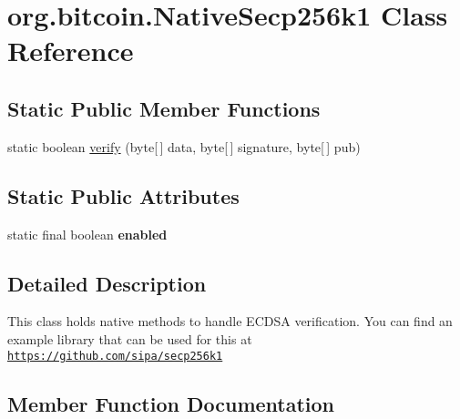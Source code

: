 \hypertarget{classorg_1_1bitcoin_1_1_native_secp256k1}{}\section{org.\+bitcoin.\+Native\+Secp256k1 Class Reference}
\label{classorg_1_1bitcoin_1_1_native_secp256k1}
\subsection*{Static Public Member Functions}
\begin{DoxyCompactItemize}
\item 
static boolean \mbox{\hyperlink{classorg_1_1bitcoin_1_1_native_secp256k1_a7ff9dbab59c8cff4ce489651f045cd0a}{verify}} (byte\mbox{[}$\,$\mbox{]} data, byte\mbox{[}$\,$\mbox{]} signature, byte\mbox{[}$\,$\mbox{]} pub)
\end{DoxyCompactItemize}
\subsection*{Static Public Attributes}
\begin{DoxyCompactItemize}
\item 
\mbox{\label{classorg_1_1bitcoin_1_1_native_secp256k1_a52e69585bc6f643505a508812f566a7d}} 
static final boolean {\bfseries enabled}
\end{DoxyCompactItemize}


\subsection{Detailed Description}
This class holds native methods to handle E\+C\+D\+SA verification. You can find an example library that can be used for this at \href{https://github.com/sipa/secp256k1}{\tt https\+://github.\+com/sipa/secp256k1} 

\subsection{Member Function Documentation}
\mbox{\label{classorg_1_1bitcoin_1_1_native_secp256k1_a7ff9dbab59c8cff4ce489651f045cd0a}} 
